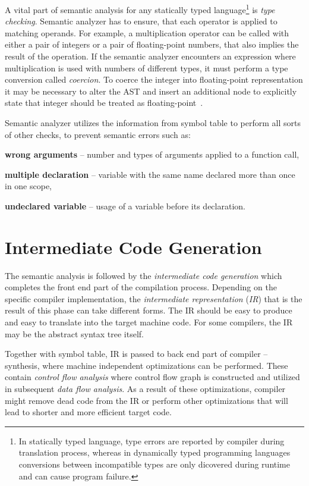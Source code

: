 \documentclass[
  digital, %
  table,   %
  lof,     %
  lot,     %
  oneside,
]{fithesis3}
\begin{document}
A vital part of semantic analysis for any statically typed language\footnote{In statically typed language, type errors are reported by compiler during translation process, whereas in dynamically typed programming languages conversions between incompatible types are only dicovered during runtime and can cause program failure.} is \textit{type checking}. Semantic analyzer has to ensure, that each operator is applied to matching operands. For example, a multiplication operator can be called with either a pair of integers or a pair of floating-point numbers, that also implies the result of the operation. If the semantic analyzer encounters an expression where multiplication is used with numbers of different types, it must perform a type conversion called \textit{coercion}. To coerce the integer into floating-point representation it may be necessary to alter the AST and insert an additional node to explicitly state that integer should be treated as floating-point~\cite{dragon-book}. 

Semantic analyzer utilizes the information from symbol table to perform all sorts of other checks, to prevent semantic errors such as:
\begin{compactitem}
  \item \textbf{wrong arguments} -- number and types of arguments applied to a function call,
  \item \textbf{multiple declaration} -- variable with the same name declared more than once in one scope,
  \item \textbf{undeclared variable} -- usage of a variable before its declaration.
\end{compactitem}
    
  \section{Intermediate Code Generation}
The semantic analysis is followed by the \textit{intermediate code generation} which completes the front end part of the compilation process. Depending on the specific compiler implementation, the \textit{intermediate representation} (\textit{IR}) that is the result of this phase can take different forms. The IR should be easy to produce and easy to translate into the target machine code. For some compilers, the IR may be the abstract syntax tree itself.

\bigskip
Together with symbol table, IR is passed to back end part of compiler -- synthesis, where machine independent optimizations can be performed. These contain \textit{control flow analysis} where control flow graph is constructed and utilized in subsequent \textit{data flow analysis}. As a result of these optimizations, compiler might remove dead code from the IR or perform other optimizations that will lead to shorter and more efficient target code.
\end{document}
